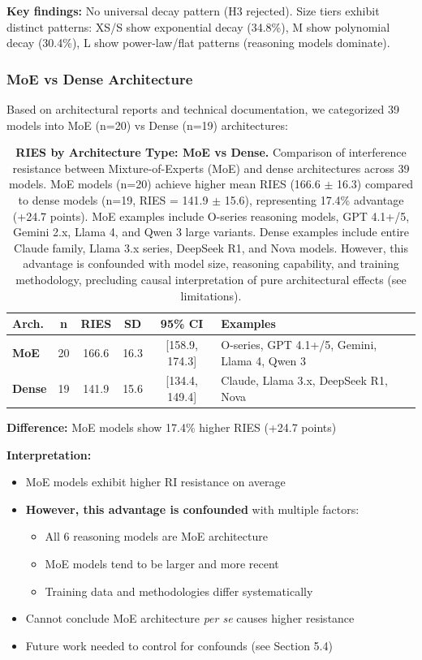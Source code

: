 \documentclass{article}
\begin{document}
\textbf{Key findings:} No universal decay pattern (H3 rejected). Size tiers exhibit distinct patterns: XS/S show exponential decay (34.8\%), M show polynomial decay (30.4\%), L show power-law/flat patterns (reasoning models dominate).

\subsubsection{MoE vs Dense Architecture}

Based on architectural reports and technical documentation, we categorized 39 models into MoE (n=20) vs Dense (n=19) architectures:

\begin{table}[t]
\centering
\small
\caption{\textbf{RIES by Architecture Type: MoE vs Dense.}
Comparison of interference resistance between Mixture-of-Experts (MoE) and dense architectures across 39 models.
MoE models (n=20) achieve higher mean RIES (166.6 $\pm$ 16.3) compared to dense models (n=19, RIES = 141.9 $\pm$ 15.6), representing 17.4\% advantage (+24.7 points).
MoE examples include O-series reasoning models, GPT 4.1+/5, Gemini 2.x, Llama 4, and Qwen 3 large variants.
Dense examples include entire Claude family, Llama 3.x series, DeepSeek R1, and Nova models.
However, this advantage is confounded with model size, reasoning capability, and training methodology, precluding causal interpretation of pure architectural effects (see limitations).}
\setlength{\tabcolsep}{3pt}
\begin{tabular}{@{}lccccp{2.8cm}@{}}
\toprule
Arch. & n & RIES & SD & 95\% CI & Examples \\
\midrule
\textbf{MoE} & 20 & 166.6 & 16.3 & [158.9, 174.3] & O-series, GPT 4.1+/5, Gemini, Llama 4, Qwen 3 \\
\textbf{Dense} & 19 & 141.9 & 15.6 & [134.4, 149.4] & Claude, Llama 3.x, DeepSeek R1, Nova \\
\bottomrule
\end{tabular}
\end{table}

\textbf{Difference:} MoE models show 17.4\% higher RIES (+24.7 points)

\textbf{Interpretation:}
\begin{itemize}[itemsep=2pt,topsep=3pt,parsep=0pt]
    \item MoE models exhibit higher RI resistance on average
    \item \textbf{However, this advantage is confounded} with multiple factors:
    \begin{itemize}[itemsep=2pt,topsep=3pt,parsep=0pt]
        \item All 6 reasoning models are MoE architecture
        \item MoE models tend to be larger and more recent
        \item Training data and methodologies differ systematically
    \end{itemize}
    \item Cannot conclude MoE architecture \textit{per se} causes higher resistance
    \item Future work needed to control for confounds (see Section 5.4)
\end{itemize}
\end{document}
